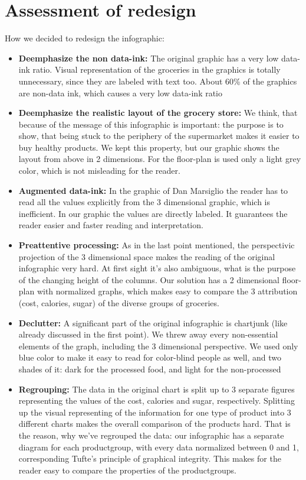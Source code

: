 \section{Assessment of redesign}

How we decided to redesign the infographic:

\begin{itemize}
	\item \textbf{Deemphasize the non data-ink:} The original graphic has a very low data-ink ratio. Visual representation of the groceries in the graphics is totally unnecessary, since they are labeled with text too. About 60\% of the graphics are non-data ink, which causes a very low data-ink ratio 
    \item \textbf{Deemphasize the realistic layout of the grocery store:} We think, that because of the message of this infographic is important: the purpose is to show, that being stuck to the periphery of the supermarket makes it easier to buy healthy products. We kept this property, but our graphic shows the layout from above in 2 dimensions. For the floor-plan is used only a light grey color, which is not misleading for the reader.
	\item \textbf{Augmented data-ink:} In the graphic of Dan Marsiglio the reader has to read all the values explicitly from the 3 dimensional graphic, which is inefficient. In our graphic the values are directly labeled. It guarantees the reader easier and faster reading and interpretation.
    \item \textbf{Preattentive processing:} As in the last point mentioned, the perspectivic projection of the 3 dimensional space makes the reading of the original infographic very hard. At first sight it's also ambiguous, what is the purpose of the changing height of the columns. Our solution has a 2 dimensional floor-plan with normalized graphs, which makes easy to compare the 3 attribution (cost, calories, sugar) of the diverse groups of groceries.
	\item \textbf{Declutter:} A significant part of the original infographic is chartjunk (like already discussed in the first point). We threw away every non-essential elements of the graph, including the 3 dimensional perspective. We used only blue color to make it easy to read for color-blind people as well, and two shades of it: dark for the processed food, and light for the non-processed
	\item \textbf{Regrouping:} The data in the original chart is split up to 3 separate figures representing the values of the cost, calories and sugar, respectively. Splitting up the visual representing of the information for one type of product into 3 different charts makes the overall comparison of the products hard. That is the reason, why we've regrouped the data: our infographic has a separate  diagram for each productgroup, with every data normalized between 0 and 1, corresponding Tufte's principle of graphical integrity. This makes for the reader easy to compare the properties of the productgroups.

\end{itemize}
